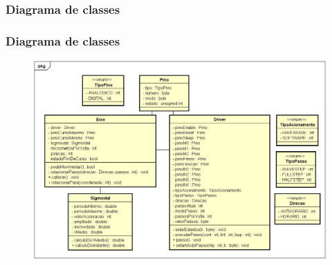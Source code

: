 \subsubsection{Diagrama de classes}

\begin{frame}
\frametitle{Diagrama de classes}

\begin{figure}
\centering
\includegraphics[scale = 0.25]{figuras/diagramaclasses}
\end{figure}

\end{frame}
